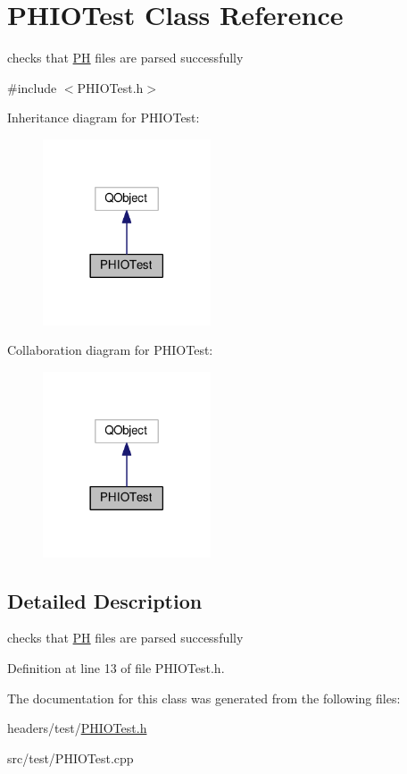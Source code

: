 \hypertarget{classPHIOTest}{\section{P\+H\+I\+O\+Test Class Reference}
\label{classPHIOTest}
}


checks that \hyperlink{classPH}{P\+H} files are parsed successfully  




{\ttfamily \#include $<$P\+H\+I\+O\+Test.\+h$>$}



Inheritance diagram for P\+H\+I\+O\+Test\+:\nopagebreak
\begin{figure}[H]
\begin{center}
\leavevmode
\includegraphics[width=141pt]{classPHIOTest__inherit__graph}
\end{center}
\end{figure}


Collaboration diagram for P\+H\+I\+O\+Test\+:\nopagebreak
\begin{figure}[H]
\begin{center}
\leavevmode
\includegraphics[width=141pt]{classPHIOTest__coll__graph}
\end{center}
\end{figure}


\subsection{Detailed Description}
checks that \hyperlink{classPH}{P\+H} files are parsed successfully 

Definition at line 13 of file P\+H\+I\+O\+Test.\+h.



The documentation for this class was generated from the following files\+:\begin{DoxyCompactItemize}
\item 
headers/test/\hyperlink{PHIOTest_8h}{P\+H\+I\+O\+Test.\+h}\item 
src/test/P\+H\+I\+O\+Test.\+cpp\end{DoxyCompactItemize}
